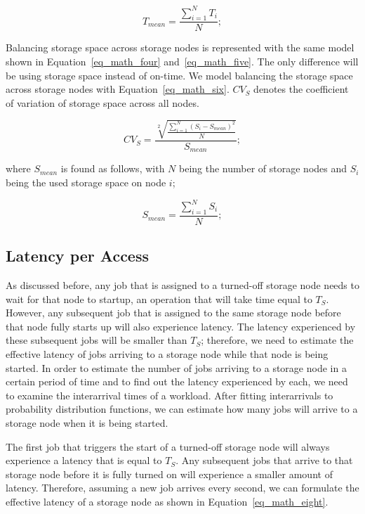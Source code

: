 \begin{equation}
\label{eq_math_five}
T_{mean} = \frac{\sum\limits_{i=1}^N T_i}{N};
\end{equation}
\hfill

Balancing storage space across storage nodes is represented with the same
model shown in Equation~\eqref{eq_math_four}
and~\eqref{eq_math_five}. The only difference will be using storage
space instead of on-time. We model balancing the storage space across storage nodes with
Equation~\eqref{eq_math_six}. $CV_{S}$ denotes the coefficient of
variation of storage space across all nodes.

\begin{equation}
\label{eq_math_six}
CV_{S} = \frac{\sqrt[2]{\frac{\sum\limits_{i=1}^N (S_i - S_{mean}) ^ 2}{N}}}{S_{mean}};
\end{equation}
\hfill

where $S_{mean}$ is found as follows, with $N$ being the number of storage nodes
and $S_i$ being the used storage space on node $i$;

\begin{equation}
\label{eq_math_seven}
S_{mean} = \frac{\sum\limits_{i=1}^N S_i}{N};
\end{equation}
\hfill
 
\subsection{Latency per Access}
As discussed before, any job
that is assigned to a turned-off storage node needs to wait for that node
to startup, an operation that will take time equal to $T_S$.
However, any subsequent job that is assigned to the same storage node before that
node fully starts up will also experience latency. The latency
experienced by these subsequent jobs will be smaller than $T_S$;
therefore, we need to estimate the effective latency of jobs arriving
to a storage node while that node is being started. In order to estimate
the number of jobs arriving to a storage node in a certain period of time and
to find out the latency experienced by each, we need to examine the
interarrival times of a workload. After fitting interarrivals to
probability distribution functions, we can estimate how many jobs will
arrive to a storage node when it is being started.

The first job that triggers the start of a turned-off storage node will
always experience a latency that is equal to $T_S$. Any subsequent
jobs that arrive to that storage node before it is fully turned on will experience
a smaller amount of latency. Therefore, assuming a new job arrives every
second, we can formulate the effective latency of a storage node as shown
in Equation~\eqref{eq_math_eight}.

